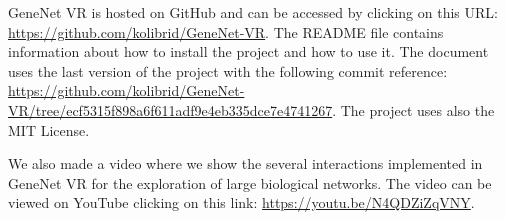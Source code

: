 GeneNet VR is hosted on GitHub and can be accessed by clicking on this URL: \url{https://github.com/kolibrid/GeneNet-VR}. The README file contains information about how to install the project and how to use it. The document uses the last version of the project with the following commit reference: \url{https://github.com/kolibrid/GeneNet-VR/tree/ecf5315f898a6f611adf9e4eb335dce7e4741267}. The project uses also the MIT License.

We also made a video where we show the several interactions implemented in GeneNet VR for the exploration of large biological networks. The video can be viewed on YouTube clicking on this link: \url{https://youtu.be/N4QDZiZqVNY}.
